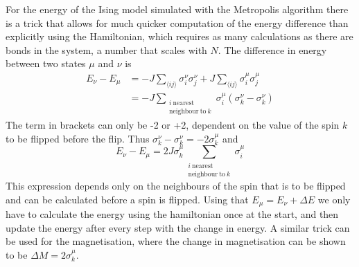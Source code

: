 \documentclass[11pt, a4paper]{report} %
\begin{document}
For the energy of the Ising model simulated with the Metropolis algorithm there is a trick that allows for much quicker computation of the energy difference than explicitly using the Hamiltonian, which requires as many calculations as there are bonds in the system, a number that scales with \(N\).
The difference in energy between two states \(\mu\) and \(\nu\) is
\begin{align}
	E_{\nu} - E_{\mu} &= -J \sum_{\langle ij \rangle} \sigma_i^{\nu} \sigma_j^{\nu} + J \sum_{\langle ij \rangle} \sigma_i^{\mu} \sigma_j^{\mu}\\
	&= -J \sum_{\substack{i\ \mathrm{nearest}\\ \mathrm{neighbour\ to}\ k}} \sigma_i^{\mu}\left(\sigma_k^{\nu} - \sigma_k^{\nu}\right)
\end{align}
The term in brackets can only be -2 or +2, dependent on the value of the spin \(k\) to be flipped before the flip.
Thus \(\sigma_k^{\nu} - \sigma_k^{\nu} = -2 \sigma_k^{\mu}\) and
\begin{equation}
	E_{\nu} - E_{\mu} = 2 J \sigma_k^{\mu} \sum_{\substack{i\ \mathrm{nearest}\\ \mathrm{neighbour\ to}\ k}} \sigma_i^{\mu}
\end{equation}
This expression depends only on the neighbours of the spin that is to be flipped and can be calculated before a spin is flipped.
Using that \(E_{\mu} = E_{\nu} + \Delta E\) we only have to calculate the energy using the hamiltonian once at the start, and then update the energy after every step with the change in energy.
A similar trick can be used for the magnetisation, where the change in magnetisation can be shown to be \(\Delta M = 2\sigma_k^{\mu}\).\cite{newman:1999}
\end{document}
